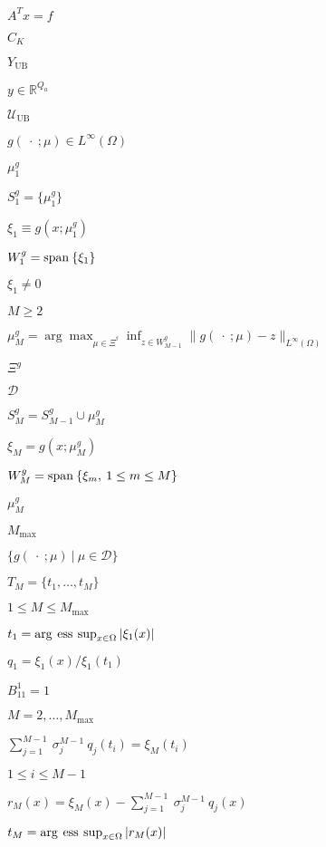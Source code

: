 \documentclass{article}
\begin{document}
$A^T x = f$
\pagebreak

$C_K$
\pagebreak

$Y_{\mathrm{UB}}$
\pagebreak

$y \in \mathbb{R}^{Q_a}$
\pagebreak

$\mathcal{U}_{\mathrm{UB}}$
\pagebreak

$g (\: \cdot\: ; \mu) \in L^{\infty} (\Omega)$
\pagebreak

$\mu^g_1$
\pagebreak

$S^g_1 = \{ \mu^g_1 \}$
\pagebreak

$\xi_1 \equiv g (x ; \mu^g_1)$
\pagebreak

$W^g_1 = {\rm span} \: \{\xi_1 \}$
\pagebreak

$\xi_1 \neq 0$
\pagebreak

$M \geq 2$
\pagebreak

$\mu^g_M = \arg \max_{\mu \in \Xi^{^g}}\inf _{z \in W^g_{M-1}} \|g (\: \cdot \: ; \mu) - z \|_{L^{\infty} (\Omega)}$
\pagebreak

$\Xi^g$
\pagebreak

${\mathcal{D}}$
\pagebreak

$S^g_M = S^g_{M-1} \cup \mu^g_M$
\pagebreak

$\xi_M = g (x;\mu^g_M)$
\pagebreak

$W^g_M = {\rm span} \: \{ \xi_m, \: 1 \leq m \leq M \}$
\pagebreak

$\mu^g_M$
\pagebreak

$M_{\max}$
\pagebreak

$\{g (\: \cdot \: ; \mu) \: | \: \mu \in \mathcal{D}\} $
\pagebreak

$T_M = \{ t_1, \ldots, t_M \}$
\pagebreak

$1 \leq M \leq M_{\max}$
\pagebreak

$t_1 = \arg \: {\rm ess} \: \sup_{x \in \Omega} | \xi_1 (x)|$
\pagebreak

$q_1 = \xi_1 (x) / \xi_1 (t_1) $
\pagebreak

$B^1_{11} = 1$
\pagebreak

$M = 2, \ldots, M_{\max}$
\pagebreak

$ \sum^{M-1}_{j = 1} \: \sigma^{M-1}_j \: q_j(t_i) = \xi_M (t_i)$
\pagebreak

$ 1 \leq i \leq M-1$
\pagebreak

$r_M (x) = \xi_M (x) - \sum^{M-1}_{j = 1}\: \sigma^{M-1}_j \: q_j (x)$
\pagebreak

$t_M = \arg \: {\rm ess} \: \sup_{x \in \Omega} |r_M (x)|$
\pagebreak
\end{document}
